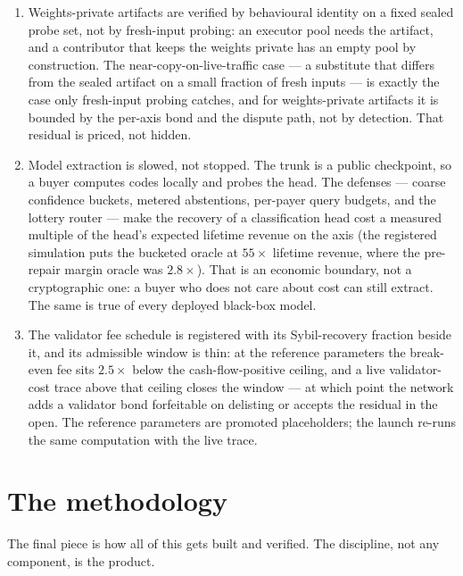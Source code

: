 \documentclass[11pt]{article}
\begin{document}
\begin{enumerate}
bus, and cheaper homomorphic evaluation --- each step measured
before it is relied on. Until that chain closes, the moat and
the capability are separate claims, and this document does not
merge them.
\item Weights-private artifacts are verified by behavioural
identity on a fixed sealed probe set, not by fresh-input
probing: an executor pool needs the artifact, and a contributor
that keeps the weights private has an empty pool by
construction. The near-copy-on-live-traffic case --- a substitute
that differs from the sealed artifact on a small fraction of
fresh inputs --- is exactly the case only fresh-input probing
catches, and for weights-private artifacts it is bounded by the
per-axis bond and the dispute path, not by detection. That
residual is priced, not hidden.
\item Model extraction is slowed, not stopped. The trunk is a
public checkpoint, so a buyer computes codes locally and probes
the head. The defenses --- coarse confidence buckets, metered
abstentions, per-payer query budgets, and the lottery router ---
make the recovery of a classification head cost a measured
multiple of the head's expected lifetime revenue on the axis
(the registered simulation puts the bucketed oracle at $55\times$
lifetime revenue, where the pre-repair margin oracle was
$2.8\times$). That is an economic boundary, not a cryptographic
one: a buyer who does not care about cost can still extract.
The same is true of every deployed black-box model.
\item The validator fee schedule is registered with its
Sybil-recovery fraction beside it, and its admissible window is
thin: at the reference parameters the break-even fee sits
$2.5\times$ below the cash-flow-positive ceiling, and a live
validator-cost trace above that ceiling closes the window --- at
which point the network adds a validator bond forfeitable on
delisting or accepts the residual in the open. The reference
parameters are promoted placeholders; the launch re-runs the same
computation with the live trace.
\end{enumerate}

\section{The methodology}\label{sec:methodology}

The final piece is how all of this gets built and verified. The
discipline, not any component, is the product.
\end{document}
